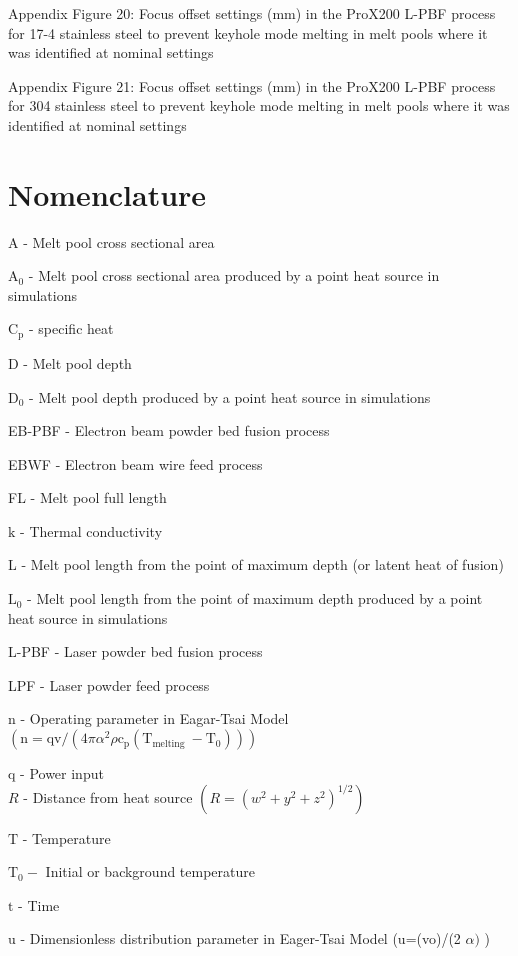 \documentclass[10pt]{article}
\begin{document}
Appendix Figure 20: Focus offset settings (mm) in the ProX200 L-PBF process for 17-4 stainless steel to prevent keyhole mode melting in melt pools where it was identified at nominal settings

Appendix Figure 21: Focus offset settings (mm) in the ProX200 L-PBF process for 304 stainless steel to prevent keyhole mode melting in melt pools where it was identified at nominal settings

\section*{Nomenclature}
A - Melt pool cross sectional area

$\mathrm{A}_{0}$ - Melt pool cross sectional area produced by a point heat source in simulations

$\mathrm{C}_{\mathrm{p}}$ - specific heat

D - Melt pool depth

$\mathrm{D}_{0}$ - Melt pool depth produced by a point heat source in simulations

EB-PBF - Electron beam powder bed fusion process

EBWF - Electron beam wire feed process

FL - Melt pool full length

$\mathrm{k}$ - Thermal conductivity

L - Melt pool length from the point of maximum depth (or latent heat of fusion)

$\mathrm{L}_{0}$ - Melt pool length from the point of maximum depth produced by a point heat source in simulations

L-PBF - Laser powder bed fusion process

LPF - Laser powder feed process

$\mathrm{n}$ - Operating parameter in Eagar-Tsai Model $\left(\mathrm{n}=\mathrm{qv} /\left(4 \pi \alpha^{2} \rho \mathrm{c}_{\mathrm{p}}\left(\mathrm{T}_{\text {melting }}-\mathrm{T}_{0}\right)\right)\right)$

q - Power input\\
$R$ - Distance from heat source $\left(R=\left(w^{2}+y^{2}+z^{2}\right)^{1 / 2}\right)$

$\mathrm{T}$ - Temperature

$\mathrm{T}_{0}-$ Initial or background temperature

$\mathrm{t}$ - Time

$\mathrm{u}$ - Dimensionless distribution parameter in Eager-Tsai Model (u=(vo)/(2 $\alpha)$ )
\end{document}

